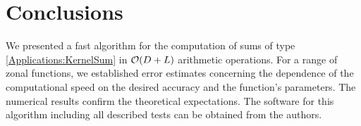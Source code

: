 \documentclass[11pt,a4paper,twoside,bibtotoc]{scrartcl}
\theoremstyle{plain}
\theoremstyle{definition}
\theoremstyle{remark}
\numberwithin{equation}{section}
\numberwithin{table}{section}
\numberwithin{figure}{section}
\begin{document}
\section{Conclusions}
We presented a fast algorithm for the computation of sums of type
\eqref{Applications:KernelSum} in ${\cal O} (D + L)$ arithmetic operations.
For a range of zonal functions, we established error estimates 
concerning the dependence of the computational speed on the desired accuracy 
and the function's parameters. The numerical results confirm the theoretical 
expectations.
The software for this algorithm including all described tests can be
obtained from the authors.



\end{document}
